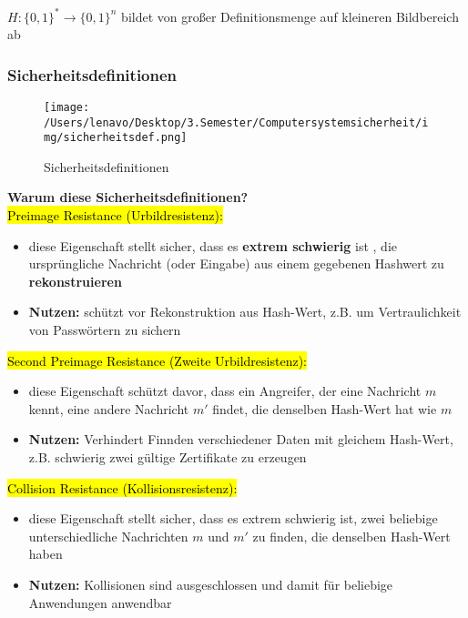 \documentclass[a4paper, 10pt]{article}
\begin{document}
$H: \{ 0,1\}^* \rightarrow \{ 0,1\}^n$ bildet von großer Definitionsmenge auf kleineren Bildbereich ab
\subsubsection{Sicherheitsdefinitionen}
\begin{figure}[h]
    \centering
    \texttt{[image: /Users/lenavo/Desktop/3.Semester/Computersystemsicherheit/img/sicherheitsdef.png]}
    \caption{Sicherheitsdefinitionen}
    \label{fig:enter-label}
\end{figure}

\noindent\textbf{Warum diese Sicherheitsdefinitionen?}\\[1.5mm]
\hl{Preimage Resistance (Urbildresistenz):}
\begin{itemize}
    \item diese Eigenschaft stellt sicher, dass es \textbf{extrem schwierig} ist , die ursprüngliche Nachricht (oder Eingabe) aus einem gegebenen Hashwert zu \textbf{rekonstruieren}
    \item \textbf{Nutzen:} schützt vor Rekonstruktion aus Hash-Wert, z.B. um Vertraulichkeit von Passwörtern zu sichern
\end{itemize}
\hl{Second Preimage Resistance (Zweite Urbildresistenz):}
\begin{itemize}
    \item diese Eigenschaft schützt davor, dass ein Angreifer, der eine Nachricht $m$ kennt, eine andere Nachricht $m'$ findet, die denselben Hash-Wert hat wie $m$
    \item \textbf{Nutzen:} Verhindert Finnden verschiedener Daten mit gleichem Hash-Wert, z.B. schwierig zwei gültige Zertifikate zu erzeugen
\end{itemize}

\noindent\hl{Collision Resistance (Kollisionsresistenz):}
\begin{itemize}
    \item diese Eigenschaft stellt sicher, dass es extrem schwierig ist, zwei beliebige unterschiedliche Nachrichten $m$ und $m'$ zu finden, die denselben Hash-Wert haben
    \item \textbf{Nutzen:} Kollisionen sind ausgeschlossen und damit für beliebige Anwendungen anwendbar
\end{itemize}
\end{document}
